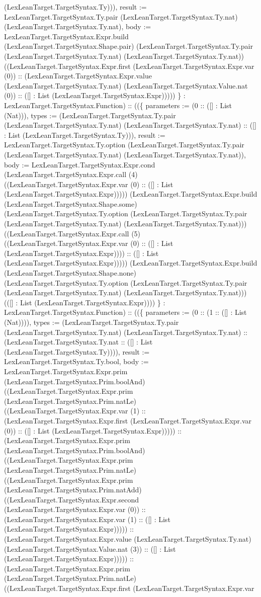 \documentclass[11pt]{article}
\begin{document}
(LexLeanTarget.TargetSyntax.Ty))), result := LexLeanTarget.TargetSyntax.Ty.pair (LexLeanTarget.TargetSyntax.Ty.nat) (LexLeanTarget.TargetSyntax.Ty.nat), body := LexLeanTarget.TargetSyntax.Expr.build (LexLeanTarget.TargetSyntax.Shape.pair) (LexLeanTarget.TargetSyntax.Ty.pair (LexLeanTarget.TargetSyntax.Ty.nat) (LexLeanTarget.TargetSyntax.Ty.nat)) ((LexLeanTarget.TargetSyntax.Expr.first (LexLeanTarget.TargetSyntax.Expr.var (0)) :: (LexLeanTarget.TargetSyntax.Expr.value (LexLeanTarget.TargetSyntax.Ty.nat) (LexLeanTarget.TargetSyntax.Value.nat (0)) :: ([] : List (LexLeanTarget.TargetSyntax.Expr))))) \} : LexLeanTarget.TargetSyntax.Function) :: ((\{ parameters := (0 :: ([] : List (Nat))), types := (LexLeanTarget.TargetSyntax.Ty.pair (LexLeanTarget.TargetSyntax.Ty.nat) (LexLeanTarget.TargetSyntax.Ty.nat) :: ([] : List (LexLeanTarget.TargetSyntax.Ty))), result := LexLeanTarget.TargetSyntax.Ty.option (LexLeanTarget.TargetSyntax.Ty.pair (LexLeanTarget.TargetSyntax.Ty.nat) (LexLeanTarget.TargetSyntax.Ty.nat)), body := LexLeanTarget.TargetSyntax.Expr.cond (LexLeanTarget.TargetSyntax.Expr.call (4) ((LexLeanTarget.TargetSyntax.Expr.var (0) :: ([] : List (LexLeanTarget.TargetSyntax.Expr))))) (LexLeanTarget.TargetSyntax.Expr.build (LexLeanTarget.TargetSyntax.Shape.some) (LexLeanTarget.TargetSyntax.Ty.option (LexLeanTarget.TargetSyntax.Ty.pair (LexLeanTarget.TargetSyntax.Ty.nat) (LexLeanTarget.TargetSyntax.Ty.nat))) ((LexLeanTarget.TargetSyntax.Expr.call (5) ((LexLeanTarget.TargetSyntax.Expr.var (0) :: ([] : List (LexLeanTarget.TargetSyntax.Expr)))) :: ([] : List (LexLeanTarget.TargetSyntax.Expr))))) (LexLeanTarget.TargetSyntax.Expr.build (LexLeanTarget.TargetSyntax.Shape.none) (LexLeanTarget.TargetSyntax.Ty.option (LexLeanTarget.TargetSyntax.Ty.pair (LexLeanTarget.TargetSyntax.Ty.nat) (LexLeanTarget.TargetSyntax.Ty.nat))) (([] : List (LexLeanTarget.TargetSyntax.Expr)))) \} : LexLeanTarget.TargetSyntax.Function) :: ((\{ parameters := (0 :: (1 :: ([] : List (Nat)))), types := (LexLeanTarget.TargetSyntax.Ty.pair (LexLeanTarget.TargetSyntax.Ty.nat) (LexLeanTarget.TargetSyntax.Ty.nat) :: (LexLeanTarget.TargetSyntax.Ty.nat :: ([] : List (LexLeanTarget.TargetSyntax.Ty)))), result := LexLeanTarget.TargetSyntax.Ty.bool, body := LexLeanTarget.TargetSyntax.Expr.prim (LexLeanTarget.TargetSyntax.Prim.boolAnd) ((LexLeanTarget.TargetSyntax.Expr.prim (LexLeanTarget.TargetSyntax.Prim.natLe) ((LexLeanTarget.TargetSyntax.Expr.var (1) :: (LexLeanTarget.TargetSyntax.Expr.first (LexLeanTarget.TargetSyntax.Expr.var (0)) :: ([] : List (LexLeanTarget.TargetSyntax.Expr))))) :: (LexLeanTarget.TargetSyntax.Expr.prim (LexLeanTarget.TargetSyntax.Prim.boolAnd) ((LexLeanTarget.TargetSyntax.Expr.prim (LexLeanTarget.TargetSyntax.Prim.natLe) ((LexLeanTarget.TargetSyntax.Expr.prim (LexLeanTarget.TargetSyntax.Prim.natAdd) ((LexLeanTarget.TargetSyntax.Expr.second (LexLeanTarget.TargetSyntax.Expr.var (0)) :: (LexLeanTarget.TargetSyntax.Expr.var (1) :: ([] : List (LexLeanTarget.TargetSyntax.Expr))))) :: (LexLeanTarget.TargetSyntax.Expr.value (LexLeanTarget.TargetSyntax.Ty.nat) (LexLeanTarget.TargetSyntax.Value.nat (3)) :: ([] : List (LexLeanTarget.TargetSyntax.Expr))))) :: (LexLeanTarget.TargetSyntax.Expr.prim (LexLeanTarget.TargetSyntax.Prim.natLe) ((LexLeanTarget.TargetSyntax.Expr.first (LexLeanTarget.TargetSyntax.Expr.var 
\end{document}

